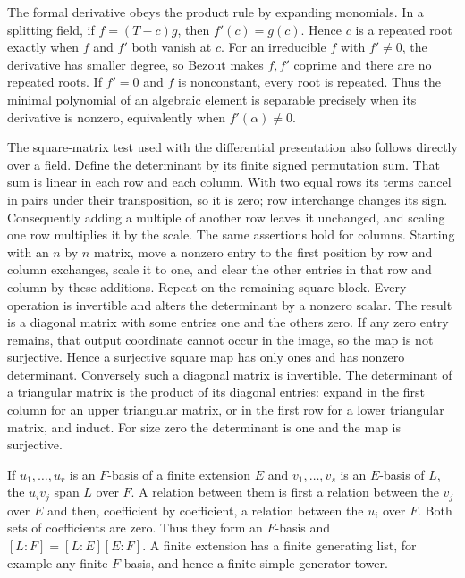 \documentclass[11pt,a4paper,openany]{report}
\begin{document}
The formal derivative obeys the product rule by expanding monomials. In a splitting field, if \(f=(T-c)g\), then \(f'(c)=g(c)\). Hence \(c\) is a repeated root exactly when \(f\) and \(f'\) both vanish at \(c\). For an irreducible \(f\) with \(f'\ne0\), the derivative has smaller degree, so Bezout makes \(f,f'\) coprime and there are no repeated roots. If \(f'=0\) and \(f\) is nonconstant, every root is repeated. Thus the minimal polynomial of an algebraic element is separable precisely when its derivative is nonzero, equivalently when \(f'(\alpha)\ne0\).

The square-matrix test used with the differential presentation also follows directly over a field. Define the determinant by its finite signed permutation sum. That sum is linear in each row and each column. With two equal rows its terms cancel in pairs under their transposition, so it is zero; row interchange changes its sign. Consequently adding a multiple of another row leaves it unchanged, and scaling one row multiplies it by the scale. The same assertions hold for columns. Starting with an \(n\) by \(n\) matrix, move a nonzero entry to the first position by row and column exchanges, scale it to one, and clear the other entries in that row and column by these additions. Repeat on the remaining square block. Every operation is invertible and alters the determinant by a nonzero scalar. The result is a diagonal matrix with some entries one and the others zero. If any zero entry remains, that output coordinate cannot occur in the image, so the map is not surjective. Hence a surjective square map has only ones and has nonzero determinant. Conversely such a diagonal matrix is invertible. The determinant of a triangular matrix is the product of its diagonal entries: expand in the first column for an upper triangular matrix, or in the first row for a lower triangular matrix, and induct. For size zero the determinant is one and the map is surjective.

If \(u_1,\ldots,u_r\) is an \(F\)-basis of a finite extension \(E\) and \(v_1,\ldots,v_s\) is an \(E\)-basis of \(L\), the \(u_iv_j\) span \(L\) over \(F\). A relation between them is first a relation between the \(v_j\) over \(E\) and then, coefficient by coefficient, a relation between the \(u_i\) over \(F\). Both sets of coefficients are zero. Thus they form an \(F\)-basis and \([L:F]=[L:E][E:F]\). A finite extension has a finite generating list, for example any finite \(F\)-basis, and hence a finite simple-generator tower.
\end{document}
